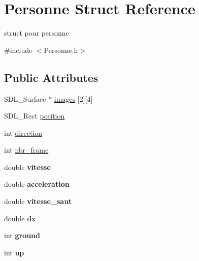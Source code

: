 \hypertarget{structPersonne}{}\section{Personne Struct Reference}
\label{structPersonne}


struct pour personne  




{\ttfamily \#include $<$Personne.\+h$>$}

\subsection*{Public Attributes}
\begin{DoxyCompactItemize}
\item 
S\+D\+L\+\_\+\+Surface $\ast$ \hyperlink{structPersonne_a692200a902f41147fb2d5189720815dd}{images} \mbox{[}2\mbox{]}\mbox{[}4\mbox{]}
\item 
S\+D\+L\+\_\+\+Rect \hyperlink{structPersonne_a4f59668cc98be99d36193946c4153ef2}{position}
\item 
int \hyperlink{structPersonne_abf281355a0155c510a69d50acc03e0f1}{direction}
\item 
int \hyperlink{structPersonne_a0fe6259a45ccfe5f2b2e7a7b24d5c15d}{nbr\+\_\+frame}
\item 
double {\bfseries vitesse}\hypertarget{structPersonne_a5f3b440f1baea5a03e7b76d3f27b773a}{}\label{structPersonne_a5f3b440f1baea5a03e7b76d3f27b773a}

\item 
double {\bfseries acceleration}\hypertarget{structPersonne_ac757341de95d4d2b1aa30075aa8df51b}{}\label{structPersonne_ac757341de95d4d2b1aa30075aa8df51b}

\item 
double {\bfseries vitesse\+\_\+saut}\hypertarget{structPersonne_a816d4a4b2d542010ffd9cea2b0e31961}{}\label{structPersonne_a816d4a4b2d542010ffd9cea2b0e31961}

\item 
double {\bfseries dx}\hypertarget{structPersonne_a1ac981b64497e4a6afd87297f18519a0}{}\label{structPersonne_a1ac981b64497e4a6afd87297f18519a0}

\item 
int {\bfseries ground}\hypertarget{structPersonne_ac5c7d916b960ee26b6cef75a69332a3b}{}\label{structPersonne_ac5c7d916b960ee26b6cef75a69332a3b}

\item 
int {\bfseries up}\hypertarget{structPersonne_a494d6adc8daa119f46d5644aadb76cde}{}\label{structPersonne_a494d6adc8daa119f46d5644aadb76cde}

\end{DoxyCompactItemize}


